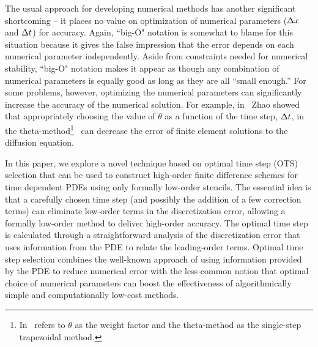 \documentclass[oneeqnum,onefignum,onetabnum,onethmnum]{siamltex}
\begin{document}
The usual approach for developing numerical methods has another significant
shortcoming -- it places no value on optimization of numerical parameters 
(\eg $\Delta x$ and $\Delta t$) for accuracy.  Again, ``big-O" notation is 
somewhat to blame for this situation because it gives the false impression 
that the error depends on each numerical parameter independently.  Aside
from constraints needed for numerical stability, ``big-O" notation makes 
it appear as though any combination of numerical parameters is equally good 
as long as they are all ``small enough.''  For some problems, however, 
optimizing the numerical parameters can significantly increase the accuracy
of the numerical solution.  For example, in~\cite{zhao_2006} Zhao showed 
that appropriately choosing the value of $\theta$ as a function of the time 
step, $\Delta t$, in the theta-method\footnote{In~\cite{zhao_2006} refers 
to $\theta$ as the weight factor and the theta-method as the single-step 
trapezoidal method.}~\cite{iserles_book, gko_book} can decrease the error 
of finite element solutions to the diffusion equation. 

In this paper, we explore a novel technique based on optimal time step (OTS)
selection that can be used to construct high-order finite difference schemes 
for time dependent PDEs using only formally low-order stencils.  The essential 
idea is that a carefully chosen time step (and possibly the addition of
a few correction terms) can eliminate low-order terms in the discretization 
error, allowing a formally low-order method to deliver high-order accuracy.  
The optimal time step is calculated through a straightforward analysis of the 
discretization error that uses information from the PDE to relate the 
leading-order terms.  Optimal time step selection combines the well-known 
approach of using information provided by the PDE to reduce numerical error 
with the less-common notion that optimal choice of numerical parameters can 
boost the effectiveness of algorithmically simple and computationally 
low-cost methods.  
\end{document}
